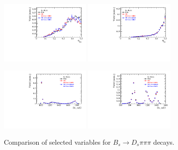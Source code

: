 \begin{figure}[h]
\includegraphics[height=!,width=0.4\textwidth]{figs/dataVsMC/norm_final/combined/Ds2KKpi_1_Bs_TAGOMEGA_OS.pdf}
\includegraphics[height=!,width=0.4\textwidth]{figs/dataVsMC/norm_final/combined/Ds2KKpi_1_Bs_SS_nnetKaon_PROB.pdf}

\includegraphics[height=!,width=0.4\textwidth]{figs/dataVsMC/norm_final/combined/Ds2KKpi_1_Ds_m12.pdf}
\includegraphics[height=!,width=0.4\textwidth]{figs/dataVsMC/norm_final/combined/Ds2KKpi_1_Ds_m13.pdf}

\caption{Comparison of selected variables for $B_s\to D_s\pi\pi\pi$ decays.}
\label{fig:}
\end{figure}

